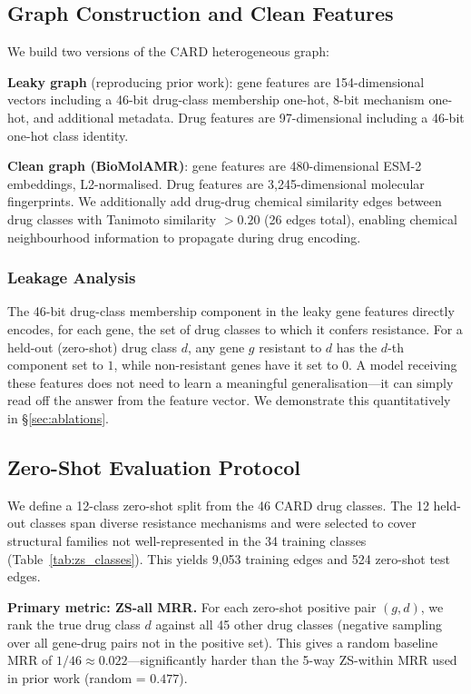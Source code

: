 \documentclass[conference]{IEEEtran}
\begin{document}
\subsection{Graph Construction and Clean Features}
\label{sec:graph}

We build two versions of the CARD heterogeneous graph:

\textbf{Leaky graph} (reproducing prior work): gene features are 154-dimensional
vectors including a 46-bit drug-class membership one-hot, 8-bit mechanism
one-hot, and additional metadata. Drug features are 97-dimensional including a
46-bit one-hot class identity.

\textbf{Clean graph (BioMolAMR)}: gene features are 480-dimensional ESM-2
embeddings, L2-normalised. Drug features are 3,245-dimensional molecular
fingerprints. We additionally add drug-drug chemical similarity edges between
drug classes with Tanimoto similarity $>0.20$ (26 edges total), enabling
chemical neighbourhood information to propagate during drug encoding.

\subsubsection{Leakage Analysis}
The 46-bit drug-class membership component in the leaky gene features directly
encodes, for each gene, the set of drug classes to which it confers resistance.
For a held-out (zero-shot) drug class $d$, any gene $g$ resistant to $d$ has
the $d$-th component set to $1$, while non-resistant genes have it set to $0$.
A model receiving these features does not need to learn a meaningful
generalisation---it can simply read off the answer from the feature vector. We
demonstrate this quantitatively in \S\ref{sec:ablations}.

\subsection{Zero-Shot Evaluation Protocol}
\label{sec:splits}

We define a 12-class zero-shot split from the 46 CARD drug classes. The
12 held-out classes span diverse resistance mechanisms and were selected to
cover structural families not well-represented in the 34 training classes
(Table~\ref{tab:zs_classes}). This yields 9,053 training edges and 524
zero-shot test edges.

\textbf{Primary metric: ZS-all MRR.} For each zero-shot positive pair
$(g, d)$, we rank the true drug class $d$ against all 45 other drug classes
(negative sampling over all gene-drug pairs not in the positive set). This
gives a random baseline MRR of $1/46 \approx 0.022$---significantly harder
than the 5-way ZS-within MRR used in prior work (random = $0.477$).
\end{document}
